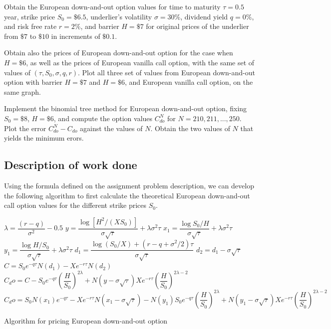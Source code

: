 Obtain the European down-and-out option values for time to maturity $\tau = 0.5$ year, strike price $S_0 = \$6.5$, underlier's volatility $\sigma = 30\%$, dividend yield $q = 0\%$, and risk free rate $r = 2\%$, and barrier $H = \$7$ for original prices of the underlier from $\$7$ to $\$10$ in increments of $\$0.1$. 

Obtain also the prices of European down-and-out option for the case when $H = \$6$, as well as the prices of European vanilla call option, with the same set of values of $(\tau, S_0, \sigma, q, r)$. Plot all three set of values from European down-and-out option with barrier $H = \$7$ and $H = \$6$, and European vanilla call option, on the same graph.

Implement the binomial tree method for European down-and-out option, fixing $S_0 = \$8$, $H = \$6$, and compute the option values $C_{do}^{N}$ for $N = 210, 211,...,250$. Plot the error $C^{N}_{do} - C_{do}$ against the values of $N$. Obtain the two values of $N$ that yields the minimum erors.

\subsection{Description of work done}
Using the formula defined on the assignment problem description, we can develop the following algorithm to first calculate the theoretical European down-and-out call option values for the different strike prices $S_0$.

\begin{algorithm}[H]
 $\lambda = \dfrac{(r - q)}{\sigma ^ 2}- 0.5$\;
 $y = \dfrac{\log{[H ^ 2/(XS_0)]}}{\sigma\sqrt{\tau}} + \lambda\sigma^2\tau$\;
 $x_1 =\dfrac{\log{S_0/H}}{\sigma\sqrt{\tau}} + \lambda\sigma^2\tau$\;
 $y_1 =\dfrac{\log{H/S_0}}{\sigma\sqrt{\tau}} + \lambda\sigma^2\tau$\;
 $d_1 =\dfrac{\log{(S_0/X)} + (r-q+\sigma^2 / 2)\tau}{\sigma\sqrt{\tau}}$\;
 $d_2 = d_1 - \sigma\sqrt{\tau}$\;
 $C = S_0e^{-q\tau}N(d_1) - X e^{-r\tau}N(d_2)$\;
  {
    $C_do = C - S_0e^{-q\tau}\left(\dfrac{H}{S_0}\right)^{2\lambda}
      + N(y-\sigma\sqrt{\tau})Xe^{-r\tau}\left(\dfrac{H}{S_0}\right)^{2\lambda-2}$\;
  }{$C_do = S_0N(x_1)e^{-q\tau}
      - Xe^{-r\tau}N(x_1-\sigma\sqrt{\tau})
      - N(y_1)S_0e^{-q\tau}\left(\dfrac{H}{S_0}\right)^{2\lambda} 
      + N(y_1-\sigma\sqrt{\tau})Xe^{-r\tau}\left(\dfrac{H}{S_0}\right)^{2\lambda-2}$\;
  }
\caption{Algorithm for pricing European down-and-out option}
\end{algorithm}

